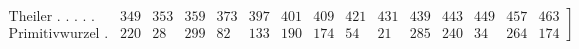 \par\begingroup\small\setlength{\arraycolsep}{1.4pt}
\[\left.\begin{array}{l*{14}{r}}
\text{Theiler . . . . . } & 349 & 353 & 359 & 373 & 397 & 401 & 409 & 421 & 431 & 439 & 443 & 449 & 457 & 463\\
\text{Primitivwurzel . .} & 220 & 28 & 299 & 82 & 133 & 190 & 174 & 54 & 21 & 285 & 240 & 34 & 264 & 174
\end{array}\right]\]
\endgroup

\par\endgroup
